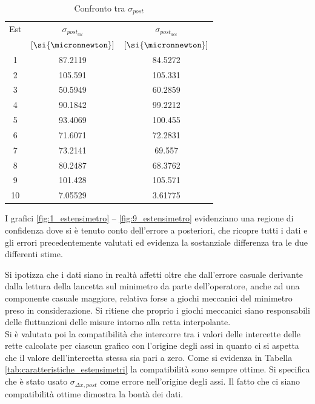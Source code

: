 \documentclass[a4paper,11pt,oneside]{article}
\begin{document}
\begin{table}
\centering
\caption{Confronto tra $\sigma_{post}$}
\label{tab:confronto_sigma_posteriori}
    \begin{tabular}{|c|c|c|}
    \hline
    Est & $\sigma_{post_{all}}$ & $\sigma_{post_{acc}}$ \\
        & $[\si{\micronnewton}]$ & $[\si{\micronnewton}]$  \\\hline
    {\cellcolor[rgb]{0.85,0.85,0.85}}1   & {\cellcolor[rgb]{0.85,0.85,0.85}}87.2119       & {\cellcolor[rgb]{0.85,0.85,0.85}}84.5272        \\\hline
    2   & 105.591       & 105.331        \\\hline
    {\cellcolor[rgb]{0.85,0.85,0.85}}3   & {\cellcolor[rgb]{0.85,0.85,0.85}}50.5949       & {\cellcolor[rgb]{0.85,0.85,0.85}}60.2859        \\\hline
    4   & 90.1842       & 99.2212        \\\hline
    {\cellcolor[rgb]{0.85,0.85,0.85}}5   & {\cellcolor[rgb]{0.85,0.85,0.85}}93.4069       & {\cellcolor[rgb]{0.85,0.85,0.85}}100.455        \\\hline
    6   & 71.6071       & 72.2831        \\\hline
    {\cellcolor[rgb]{0.85,0.85,0.85}}7   & {\cellcolor[rgb]{0.85,0.85,0.85}}73.2141       & {\cellcolor[rgb]{0.85,0.85,0.85}}69.557         \\\hline
    8   & 80.2487       & 68.3762        \\\hline
    {\cellcolor[rgb]{0.85,0.85,0.85}}9   & {\cellcolor[rgb]{0.85,0.85,0.85}}101.428       & {\cellcolor[rgb]{0.85,0.85,0.85}}105.571        \\\hline
    10  & 7.05529       & 3.61775        \\\hline
    \end{tabular}
\end{table}

I grafici \ref{fig:1_estensimetro} -- \ref{fig:9_estensimetro} evidenziano una regione di confidenza dove si è tenuto conto dell'errore a posteriori, che ricopre tutti i dati e gli errori precedentemente valutati ed evidenza la sostanziale differenza tra le due differenti stime.

Si ipotizza che i dati siano in realtà affetti oltre che dall'errore casuale derivante dalla lettura della lancetta sul minimetro da parte dell'operatore, anche ad una componente casuale maggiore, relativa forse a giochi meccanici del minimetro preso in considerazione. Si ritiene che proprio i giochi meccanici siano responsabili delle fluttuazioni delle misure intorno alla retta interpolante.\\
Si è valutata poi la compatibilità che intercorre tra i valori delle intercette delle rette calcolate per ciascun grafico con l'origine degli assi in quanto ci si aspetta che il valore dell'intercetta stessa sia pari a zero. Come si evidenza in Tabella \ref{tab:caratteristiche_estensimetri} la compatibilità sono sempre ottime. Si specifica che è stato usato $\sigma_{\Delta x, post}$ come errore nell'origine degli assi. Il fatto che ci siano compatibilità ottime dimostra la bontà dei dati.
\end{document}
